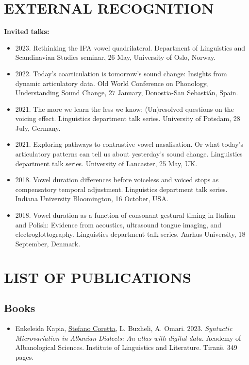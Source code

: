 \documentclass{article}
\begin{document}
\section{EXTERNAL RECOGNITION}

\textbf{Invited talks:}

\begin{itemize}
\item 2023. Rethinking the IPA vowel quadrilateral. Department of Linguistics and Scandinavian Studies seminar, 26 May, University of Oslo, Norway.
\item 2022. Today’s coarticulation is tomorrow’s sound change: Insights from dynamic articulatory data. Old World Conference on Phonology, Understanding Sound Change, 27 January, Donostia-San Sebastián, Spain.
\item 2021. The more we learn the less we know: (Un)resolved questions on the voicing effect. Linguistics department talk series. University of Potsdam, 28 July, Germany.
\item 2021. Exploring pathways to contrastive vowel nasalisation. Or what today’s articulatory patterns can tell us about yesterday’s sound change. Linguistics department talk series. University of Lancaster, 25 May, UK.
\item 2018. Vowel duration differences before voiceless and voiced stops as compensatory temporal adjustment. Linguistics department talk series. Indiana University Bloomington, 16 October, USA.
\item 2018. Vowel duration as a function of consonant gestural timing in Italian and Polish: Evidence from acoustics, ultrasound tongue imaging, and electroglottography. Linguistics department talk series. Aarhus University, 18 September, Denmark.
\end{itemize}

\section{LIST OF PUBLICATIONS}

\subsection{Books}

\begin{itemize}
	\item Enkeleida Kapia, \underline{Stefano Coretta}, L. Buxheli, A. Omari. 2023. \textit{Syntactic Microvariation in Albanian Dialects: An atlas with digital data.} Academy of Albanological Sciences. Institute of Linguistics and Literature. Tiranë. 349 pages.
\end{itemize}
\end{document}
